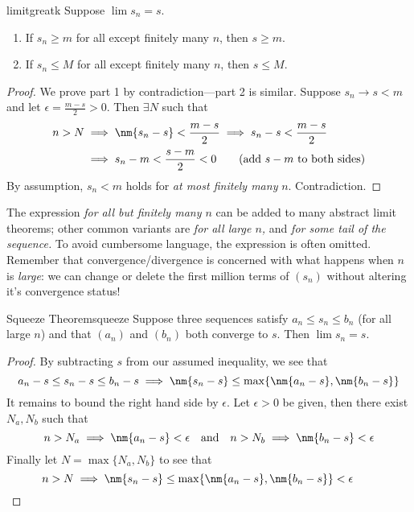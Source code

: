 \begin{thm}{}{limitgreatk}
	Suppose $\lim s_n=s$.
	\begin{enumerate}
	  \item If $s_n\ge m$ for all except finitely many $n$, then $s\ge m$.
	  \item If $s_n\le M$ for all except finitely many $n$, then $s\le M$.
	\end{enumerate} 
\end{thm}

\begin{proof}
	We prove part 1 by contradiction---part 2 is similar.\smallbreak
	Suppose $s_n\to s<m$ and let $\epsilon=\frac{m-s}2>0$. Then $\exists N$ such that
	\begin{align*}
	n>N&\implies \nm{s_n-s}<\frac{m-s}2\implies s_n-s<\frac{m-s}2\\
	&\implies s_n-m<\frac{s-m}2<0\tag*{(add $s-m$ to both sides)}
	\end{align*}
	By assumption, $s_n<m$ holds for \emph{at most finitely many} $n$. Contradiction.
\end{proof}

The expression \emph{for all but finitely many $n$} can be added to many abstract limit theorems; other common variants are \emph{for all large $n$,} and \emph{for some tail of the sequence.} To avoid cumbersome language, the expression is often omitted. Remember that convergence/divergence is concerned with what happens when $n$ is \emph{large}: we can change or delete the first million terms of $(s_n)$ without altering it's convergence status!

\vfil\vfil
\goodbreak


\begin{thm}{Squeeze Theorem}{squeeze}
	Suppose three sequences satisfy $a_n\le s_n\le b_n$ (for all large $n$) and that $(a_n)$ and $(b_n)$ both converge to $s$. Then $\lim s_n=s$.
\end{thm}

\begin{proof}
	By subtracting $s$ from our assumed inequality, we see that
	\[a_n-s\le s_n-s\le b_n-s\implies\nm{s_n-s}\le\max\{\nm{a_n-s},\nm{b_n-s}\}\]
	It remains to bound the right hand side by $\epsilon$. Let $\epsilon>0$ be given, then there exist $N_a,N_b$ such that
	\[n>N_a\implies \nm{a_n-s}<\epsilon\quad\text{and}\quad n>N_b\implies \nm{b_n-s}<\epsilon\]
	Finally let $N=\max\{N_a,N_b\}$ to see that
	\[n>N\implies \nm{s_n-s}\le\max\{\nm{a_n-s},\nm{b_n-s}\}<\epsilon\tag*{\qedhere}\]
\end{proof}


